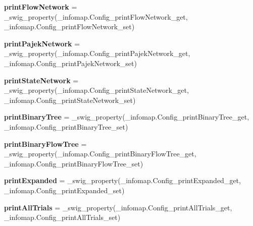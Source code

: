 \begin{DoxyCompactItemize}
{\bfseries print\+Flow\+Network} = \+\_\+swig\+\_\+property(\+\_\+infomap.\+Config\+\_\+print\+Flow\+Network\+\_\+get, \+\_\+infomap.\+Config\+\_\+print\+Flow\+Network\+\_\+set)
\item 
\mbox{\label{classdsmacc_1_1graph_1_1infomap_1_1infomap_1_1Config_adfc6433adeab158542b327c02839131e}} 
{\bfseries print\+Pajek\+Network} = \+\_\+swig\+\_\+property(\+\_\+infomap.\+Config\+\_\+print\+Pajek\+Network\+\_\+get, \+\_\+infomap.\+Config\+\_\+print\+Pajek\+Network\+\_\+set)
\item 
\mbox{\label{classdsmacc_1_1graph_1_1infomap_1_1infomap_1_1Config_a821e5ec26174a5d6c81f649405b03b82}} 
{\bfseries print\+State\+Network} = \+\_\+swig\+\_\+property(\+\_\+infomap.\+Config\+\_\+print\+State\+Network\+\_\+get, \+\_\+infomap.\+Config\+\_\+print\+State\+Network\+\_\+set)
\item 
\mbox{\label{classdsmacc_1_1graph_1_1infomap_1_1infomap_1_1Config_af48a451bc66325eeb53b4c6b78a9151f}} 
{\bfseries print\+Binary\+Tree} = \+\_\+swig\+\_\+property(\+\_\+infomap.\+Config\+\_\+print\+Binary\+Tree\+\_\+get, \+\_\+infomap.\+Config\+\_\+print\+Binary\+Tree\+\_\+set)
\item 
\mbox{\label{classdsmacc_1_1graph_1_1infomap_1_1infomap_1_1Config_a5edea99556d10fc212271a3f4041a89b}} 
{\bfseries print\+Binary\+Flow\+Tree} = \+\_\+swig\+\_\+property(\+\_\+infomap.\+Config\+\_\+print\+Binary\+Flow\+Tree\+\_\+get, \+\_\+infomap.\+Config\+\_\+print\+Binary\+Flow\+Tree\+\_\+set)
\item 
\mbox{\label{classdsmacc_1_1graph_1_1infomap_1_1infomap_1_1Config_a87e6ffa7729d5b8003777b16adf3aa1b}} 
{\bfseries print\+Expanded} = \+\_\+swig\+\_\+property(\+\_\+infomap.\+Config\+\_\+print\+Expanded\+\_\+get, \+\_\+infomap.\+Config\+\_\+print\+Expanded\+\_\+set)
\item 
\mbox{\label{classdsmacc_1_1graph_1_1infomap_1_1infomap_1_1Config_aed24b59d2b3bd1a5213d9193f6b3c965}} 
{\bfseries print\+All\+Trials} = \+\_\+swig\+\_\+property(\+\_\+infomap.\+Config\+\_\+print\+All\+Trials\+\_\+get, \+\_\+infomap.\+Config\+\_\+print\+All\+Trials\+\_\+set)

\end{DoxyCompactItemize}

